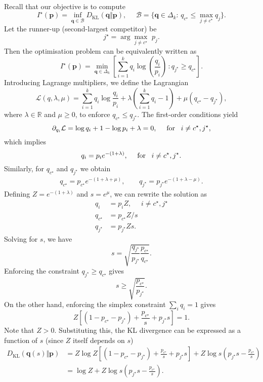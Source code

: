 Recall that our objective is to compute
\begin{equation}\label{eq:bad_set_sanov_exponent}
    I^\star(\mathbf{p}) = \inf_{\mathbf{q}\in\mathcal{B}} D_\text{KL}(\mathbf{q}\Vert \mathbf{p}),\quad\,\, \mathcal{B} = \{\mathbf{q}\in \Delta_k:\,q_{c^\star}\leq \max_{j \neq c^\star} q_j\}.
\end{equation}
Let the runner-up (second-largest competitor) be
$${j^\star} = \arg\max_{j \neq c^\star}\,\, p_j.$$ 
Then the optimisation problem can be equivalently written as
$$
I^\star(\mathbf{p}) = \min_{\mathbf q \in \Delta_k}\left[\sum_{i=1}^k q_i \log\left (\frac{q_i}{p_i}\right) \,: q_{j^\star} \geq q_{c^\star}\right].
$$
Introducing Lagrange multipliers, we define the Lagrangian
$$
\mathcal{L}(q, \lambda, \mu) = \sum_{i=1}^kq_i\log \frac{q_i}{p_i} + \lambda\left(\sum_{i=1}^k q_i - 1\right) + \mu(q_{c^\star} - q_{j^\star}),
$$
where $\lambda\in\mathbb{R}$ and $\mu\geq 0$, to enforce $q_{c^\star}\leq q_{j^\star}$. 
The first-order conditions yield
$$
\partial_{q_i}\mathcal{L} = \log q_i + 1 - \log p_i + \lambda = 0, \quad \,\, \text{for \,\,\,}i \neq c^\star, j^\star,
$$
which implies
$$
q_i = p_i e^{-(1 + \lambda)}, \quad \,\, \text{for \,\,\,}i \neq c^\star, j^\star.
$$
Similarly, for $q_{c^\star}$ and $q_{j^\star}$ we obtain
$$
\begin{aligned}
q_{c^\star} = p_{c^\star} e^{-(1+\lambda+\mu)},\qquad
q_{j^\star}=p_{j^\star}e^{-(1+\lambda-\mu)}.
\end{aligned}
$$
Defining $Z = e^{-(1+\lambda)}$ and $s = e^{\mu}$, we can rewrite the solution as
$$
\begin{aligned}
q_i &= p_i Z, \quad\,\, i \neq c^\star, j^\star\\
q_{c^\star} &= p_{c^\star} Z/s \\
q_{j^\star} &= p_{j^\star}Zs.
\end{aligned}
$$
Solving for $s$, we have
$$
s = \sqrt{\frac{q_{j^\star}}{p_{j^\star}} \frac{p_{c^\star}}{q_{c^\star}}}.
$$
Enforcing the constraint $q_{j^\star} \geq q_{c^\star}$ gives
$$
s \geq \sqrt{\frac{p_{c^\star}}{p_{j^\star}}}.
$$
On the other hand, enforcing the simplex constraint $\sum_i q_i = 1$ gives
$$
Z\left[(1 - p_{c^\star} - p_{j^\star}) + \frac{p_{c^\star}}{s} + p_{j^\star}s\right] = 1.
$$
    Note that $Z>0$. Substituting this, the KL divergence can be expressed as a function of $s$ (since $Z$ itself depends on $s$)
    \begin{align*}
    D_{\text{KL}}(\mathbf{q}(s)\Vert \mathbf{p} ) &= Z\log Z\left[(1-p_{c^\star}-p_{j^\star})+\frac{p_{c^\star}}{s}+p_{j^\star}s\right]
    +Z\log s\left(p_{j^\star}s-\frac{p_{c^\star}}{s}\right) 
    \\&= \log Z + Z \log s\left(p_{j^\star} s - \frac{p_{c^\star}}{s}\right).
    \end{align*}
